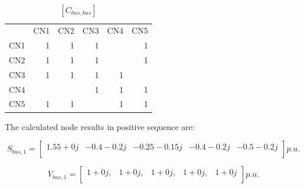 \documentclass[nols,a4paper,twoside,symmetric,notoc,fleqn]{tufte-book}
\begin{document}
\begin{table}[h!]
	\begin{tabular}{lrrrrr}
		{} &  CN1 &  CN2 &  CN3 &  CN4 &  CN5 \\
		CN1 &    1 &    1 &    1 &      &    1 \\
		CN2 &    1 &    1 &    1 &      &    1 \\
		CN3 &    1 &    1 &    1 &    1 &      \\
		CN4 &      &      &    1 &    1 &    1 \\
		CN5 &    1 &    1 &      &    1 &    1 \\
	\end{tabular}
\caption{$[C_{bus, bus}]$}
\end{table}





The calculated node results in positive sequence are:
%

$$
S_{bus,1} = \left[ \begin{array}{ccccc}
1.55+0  j & -0.4 -0.2 j & -0.25-0.15j & -0.4 -0.2 j & -0.5 -0.2 j\\
\end{array} \right] p.u.
$$

$$
V_{bus,1} = \left[ \begin{array}{ccccc}
1+0j, & 1+0j,  & 1+0j, & 1+0j,  & 1+0j \\
\end{array} \right] p.u.
$$
\end{document}
